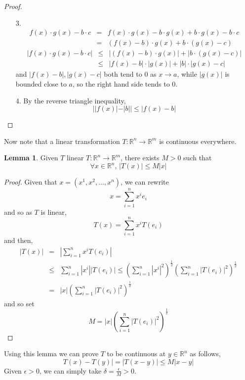 \documentclass[a4paper,14pt]{extarticle}
\theoremstyle{definition}
\newtheorem*{lemma}{Lemma}
\begin{document}
\begin{proof} \hfill
	\begin{enumerate}
		\item[3.] \begin{eqnarray*}
				f(x)\cdot g(x)-b\cdot c&=&f(x)\cdot g(x)-b\cdot g(x) + b\cdot g(x)-b\cdot c \\
					&=&(f(x)-b)\cdot g(x) + b\cdot(g(x)-c)
			\end{eqnarray*}
			\begin{eqnarray*}
				|f(x)\cdot g(x)-b\cdot c|&\leq&|(f(x)-b)\cdot g(x)|+|b\cdot(g(x)-c)| \\
				&\leq&|f(x)-b|\cdot|g(x)|+|b|\cdot|g(x)-c|
			\end{eqnarray*}
			and $|f(x)-b|, |g(x)-c|$ both tend to 0 as $x\to a$, while $|g(x)|$ is bounded close to $a$, so the right hand side tends to 0.
		\item[4.] By the reverse triangle inequality, \[||f(x)|-|b||\leq|f(x)-b|\]
	\end{enumerate}
\end{proof}

Now note that a linear transformation $T:\mathbb{R}^n\rightarrow\mathbb{R}^m$ is continuous everywhere.

\begin{lemma}
	Given $T$ linear $T:\mathbb{R}^n\rightarrow\mathbb{R}^m$, there exists $M>0$ such that \[\forall x\in\mathbb{R}^n, \,|T(x)|\leq M|x|\]
\end{lemma}

\begin{proof}
	Given that $x=(x^1,x^2,\ldots,x^n)$, we can rewrite \[x=\sum_{i=1}^n x^i e_i\] and so as $T$ is linear, \[T(x)=\sum_{i=1}^n x^i T(e_i)\]
	and then, 
	\begin{eqnarray*}
		|T(x)|&=&|\sum_{i=1}^n x^i T(e_i)| \\
			&\leq&\sum_{i=1}^n|x^i||T(e_i)|\leq(\sum_{i=1}^n|x^i|^2)^\frac{1}{2}(\sum_{i=1}^n|T(e_i)|^2)^\frac{1}{2} \\
			&=&|x|(\sum_{i=1}^n|T(e_i)|^2)^\frac{1}{2}
	\end{eqnarray*}
	and so set \[M=|x|(\sum_{i=1}^n|T(e_i)|^2)^\frac{1}{2}\]
\end{proof}

Using this lemma we can prove $T$ to be continuous at $y\in\mathbb{R}^n$ as follows,
\[T(x)-T(y)|=|T(x-y)|\leq M|x-y|\] Given $\epsilon>0$, we can simply take $\delta=\frac{\epsilon}{M}>0$.
\end{document}

